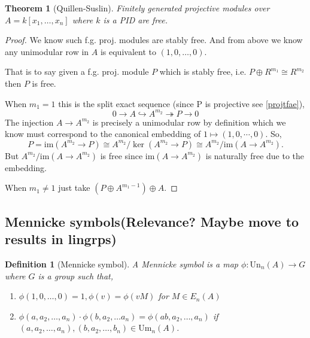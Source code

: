 \documentclass[12pt]{article}
\numberwithin{equation}{section}
\newcounter{dummy} \numberwithin{dummy}{section}
\newtheorem{theorem}[dummy]{Theorem}
\newtheorem{definition}[dummy]{Definition}
\begin{document}
	
	
	\begin{theorem}[Quillen-Suslin]
		Finitely generated projective modules over $A=k[x_1,\dots,x_n]$ where $k$ is a PID are free.
	\end{theorem}
	\begin{proof}
		We know such f.g. proj. modules are stably free. And from above we know any unimodular row in $A$ is equivalent to $(1,0,\dots,0)$.
		
		That is to say given a f.g. proj. module $P$ which is stably free, i.e. $P \oplus R^{m_1} \cong R^{m_2}$ then $P$ is free.
		
		When $m_1=1$ this is the split exact sequence (since P is projective see \ref{projtfae}),
		\[ 0 \to A \hookrightarrow A^{m_2}  \twoheadrightarrow P \to 0 \]
		The injection $A \to A^{m_2}$ is precisely a unimodular row by definition which we know must correspond to the canonical embedding of $1 \mapsto (1,0,\cdots, 0)$.
		So,$$P = \mathrm{im}(A^{m_2} \to P) \cong A^{m_2}/\ker (A^{m_2} \to P) \cong A^{m_2}/\mathrm{im}(A \to A^{m_2}).$$
		But $A^{m_2}/\mathrm{im}(A \to A^{m_2})$ is free since $\mathrm{im}(A \to A^{m_2})$ is naturally free due to the embedding.
		
		When $m_1 \neq 1$ just take $(P \oplus A^{m_1-1}) \oplus A$.
	\end{proof}
	\subsection{Mennicke symbols(Relevance? Maybe move to results in lingrps)}
	\begin{definition}[Mennicke symbol]
		A Mennicke symbol is a map $\phi : \mathrm{Un}_{n}(A) \to G $ where $G$ is a group such that,
		\begin{enumerate}
			\item $\phi(1,0,\dots, 0)=1, \phi(v)=\phi(v M)$ for $M \in E_n(A)$
			\item $\phi(a,a_2,\dots,a_n)\cdot \phi(b,a_2, \dots a_n)=\phi(ab,a_2,\dots, a_n)$ if $(a,a_2,\dots,a_n), (b,a_2,\dots,b_n) \in \mathrm{Um}_n(A)$.
		\end{enumerate}
	\end{definition}

	
\end{document}
